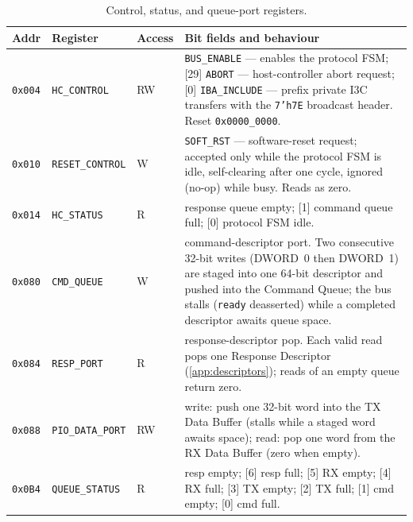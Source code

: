 \begin{table}[!htb]\centering
  \caption{Control, status, and queue-port registers.}
  \label{tab:app-csr-ctrl}
  \small
  \begin{tabular}{@{}lll>{\raggedright\arraybackslash}p{}@{}}
    \toprule
    \textbf{Addr} & \textbf{Register} & \textbf{Access} & \textbf{Bit fields and behaviour} \\
    \midrule
    \texttt{0x004} & \texttt{HC\_CONTROL} & RW &
      [31] \texttt{BUS\_ENABLE} --- enables the protocol FSM;
      [29] \texttt{ABORT} --- host-controller abort request;
      [0] \texttt{IBA\_INCLUDE} --- prefix private I3C transfers with the \texttt{7'h7E}
      broadcast header. Reset \texttt{0x0000\_0000}. \\
    \addlinespace
    \texttt{0x010} & \texttt{RESET\_CONTROL} & W &
      [0] \texttt{SOFT\_RST} --- software-reset request; accepted only while the protocol
      FSM is idle, self-clearing after one cycle, ignored (no-op) while busy. Reads as zero. \\
    \addlinespace
    \texttt{0x014} & \texttt{HC\_STATUS} & R &
      [2] response queue empty; [1] command queue full; [0] protocol FSM idle. \\
    \addlinespace
    \texttt{0x080} & \texttt{CMD\_QUEUE} & W &
      command-descriptor port. Two consecutive 32-bit writes (DWORD~0 then DWORD~1) are
      staged into one 64-bit descriptor and pushed into the Command Queue; the bus stalls
      (\texttt{ready} deasserted) while a completed descriptor awaits queue space. \\
    \addlinespace
    \texttt{0x084} & \texttt{RESP\_PORT} & R &
      response-descriptor pop. Each valid read pops one Response Descriptor
      (\cref{app:descriptors}); reads of an empty queue return zero. \\
    \addlinespace
    \texttt{0x088} & \texttt{PIO\_DATA\_PORT} & RW &
      write: push one 32-bit word into the TX Data Buffer (stalls while a staged word awaits
      space); read: pop one word from the RX Data Buffer (zero when empty). \\
    \addlinespace
    \texttt{0x0B4} & \texttt{QUEUE\_STATUS} & R &
      [7] resp empty; [6] resp full; [5] RX empty; [4] RX full;
      [3] TX empty; [2] TX full; [1] cmd empty; [0] cmd full. \\
    \bottomrule
  \end{tabular}
\end{table}

